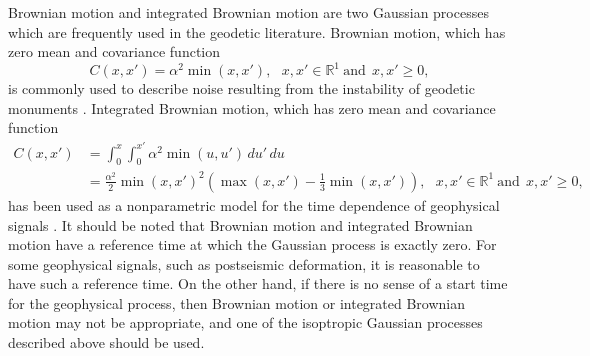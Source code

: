 \documentclass[10pt,a4paper]{article}
\begin{document}
Brownian motion and integrated Brownian motion are two Gaussian processes which are frequently used in the geodetic literature.  Brownian motion, which has zero mean and covariance function
\begin{equation}\label{eq:BM}
C(x,x') =\alpha^2 \min(x,x'), \ \ \ x,x' \in \mathbb{R}^1 \ \mathrm{and} \ \ x,x' \geq 0, 
\end{equation} 
is commonly used to describe noise resulting from the instability of geodetic monuments \citep[e.g.,][]{Wyatt1982,Wyatt1989,Langbein1997}. Integrated Brownian motion, which has zero mean and covariance function
\begin{align}\label{eq:IBM}
C(x,x') &= \int_0^x \int_0^{x'} \alpha^2 \min(u,u') \,du'\,du \\
        &= \frac{\alpha^2}{2}\min(x,x')^2 \left(\max(x,x') - \frac{1}{3}\min(x,x')\right), \ \ \ x,x' \in \mathbb{R}^1 \ \mathrm{and} \ \ x,x' \geq 0,
\end{align}
has been used as a nonparametric model for the time dependence of geophysical signals \citep[e.g.,][]{Segall1997,McGuire2003,Ohtani2010,Hines2016}. It should be noted that Brownian motion and integrated Brownian motion have a reference time at which the Gaussian process is exactly zero. For some geophysical signals, such as postseismic deformation, it is reasonable to have such a reference time. On the other hand, if there is no sense of a start time for the geophysical process, then Brownian motion or integrated Brownian motion may not be appropriate, and one of the isoptropic Gaussian processes described above should be used.        
\end{document}
